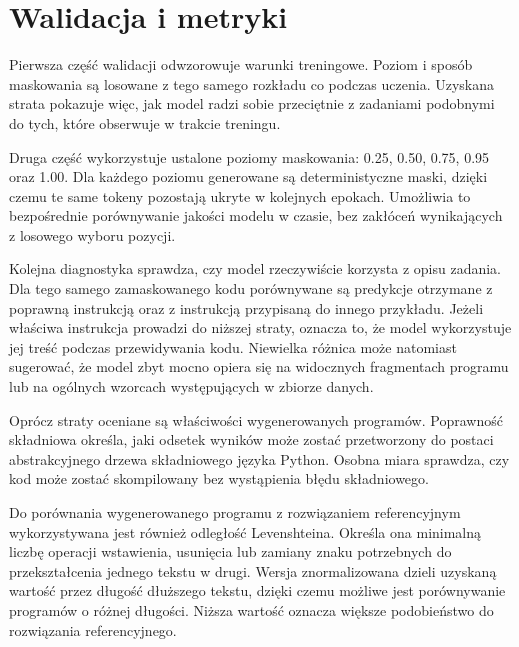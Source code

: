 
\section{Walidacja i metryki}
\label{sec:walidacja}

Pierwsza część walidacji odwzorowuje warunki treningowe. Poziom i sposób maskowania są losowane z tego samego rozkładu co podczas uczenia. Uzyskana strata pokazuje więc, jak model radzi sobie przeciętnie z zadaniami podobnymi do tych, które obserwuje w trakcie treningu.

Druga część wykorzystuje ustalone poziomy maskowania: \num{0.25}, \num{0.50}, \num{0.75}, \num{0.95} oraz \num{1.00}. Dla każdego poziomu generowane są deterministyczne maski, dzięki czemu te same tokeny pozostają ukryte w kolejnych epokach. Umożliwia to bezpośrednie porównywanie jakości modelu w czasie, bez zakłóceń wynikających z losowego wyboru pozycji.

Kolejna diagnostyka sprawdza, czy model rzeczywiście korzysta z opisu zadania. Dla tego samego zamaskowanego kodu porównywane są predykcje otrzymane z poprawną instrukcją oraz z instrukcją przypisaną do innego przykładu. Jeżeli właściwa instrukcja prowadzi do niższej straty, oznacza to, że model wykorzystuje jej treść podczas przewidywania kodu. Niewielka różnica może natomiast sugerować, że model zbyt mocno opiera się na widocznych fragmentach programu lub na ogólnych wzorcach występujących w zbiorze danych.

Oprócz straty oceniane są właściwości wygenerowanych programów. Poprawność składniowa określa, jaki odsetek wyników może zostać przetworzony do postaci abstrakcyjnego drzewa składniowego języka Python. Osobna miara sprawdza, czy kod może zostać skompilowany bez wystąpienia błędu składniowego.

Do porównania wygenerowanego programu z rozwiązaniem referencyjnym wykorzystywana jest również odległość Levenshteina. Określa ona minimalną liczbę operacji wstawienia, usunięcia lub zamiany znaku potrzebnych do przekształcenia jednego tekstu w drugi. Wersja znormalizowana dzieli uzyskaną wartość przez długość dłuższego tekstu, dzięki czemu możliwe jest porównywanie programów o różnej długości. Niższa wartość oznacza większe podobieństwo do rozwiązania referencyjnego.

